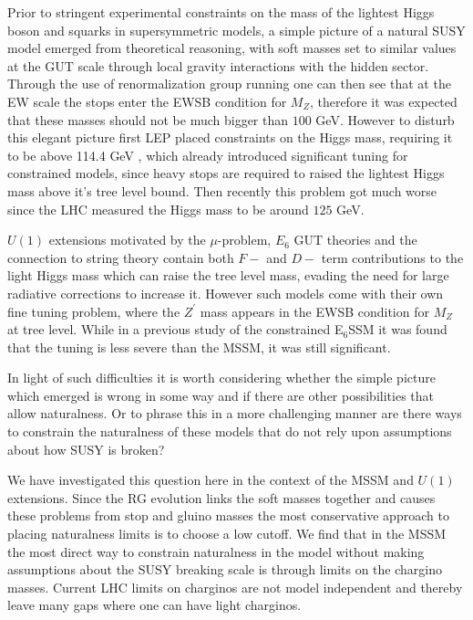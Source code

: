 \documentclass[preprint,amsmath,amssymb,aps,superscriptaddress,prd,
showpacs,floatfix,nofootinbib]{revtex4-1}
\begin{document}
Prior to stringent experimental constraints on the mass of the
lightest Higgs boson and squarks in supersymmetric models, a simple
picture of a natural SUSY model emerged from theoretical reasoning,
with soft masses set to similar values at the GUT scale through local
gravity interactions with the hidden sector.  Through the use of
renormalization group running one can then see that at the EW scale
the stops enter the EWSB condition for $M_Z$, therefore it was
expected that these masses should not be much bigger than $100$ GeV.
However to disturb this elegant picture first LEP placed constraints
on the Higgs mass, requiring it to be above 114.4 GeV
\cite{Barate:2003sz, Schael:2006cr}, which already introduced
significant tuning for constrained models, since heavy stops are
required to raised the lightest Higgs mass above it's tree level
bound. Then recently this problem got much worse since the LHC measured the
Higgs mass to be around $125$ GeV.

$U(1)$ extensions motivated by the $\mu$-problem, $E_6$ GUT theories
and the connection to string theory contain both $F-$ and $D-$ term
contributions to the light Higgs mass which can raise the tree level
mass, evading the need for large radiative corrections to increase it.
However such models come with their own fine tuning problem, where the
$Z^\prime$ mass appears in the EWSB condition for $M_Z$ at tree level.
While in a previous study of the constrained E$_6$SSM it was found
that the tuning is less severe than the MSSM, it was still significant.

In light of such difficulties it is worth considering whether the
simple picture which emerged is wrong in some way and if there are
other possibilities that allow naturalness.  Or to phrase this in a
more challenging manner are there ways to constrain the naturalness of
these models that do not rely upon assumptions about how SUSY is
broken?

We have investigated this question here in the context of the MSSM and
$U(1)$ extensions.  Since the RG evolution links the soft masses
together and causes these problems from stop and gluino masses the
most conservative approach to placing naturalness limits is to choose
a low cutoff.  We find that in the MSSM the most direct way to
constrain naturalness in the model without making assumptions about
the SUSY breaking scale is through limits on the chargino
masses.  Current LHC limits on charginos are not model independent and
thereby leave many gaps where one can have light charginos.
\end{document}
